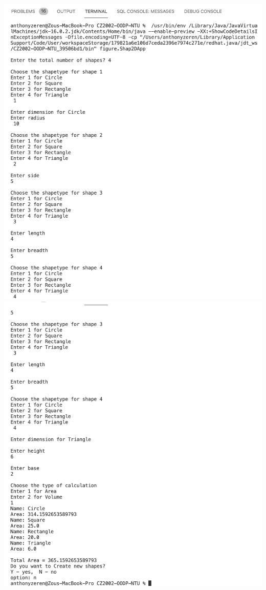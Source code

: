 \documentclass[hidelinks,12pt]{article}
\begin{document}
\includegraphics[scale=0.4]{tc2D1.png}
\includegraphics[scale=0.4]{tc2D2.png}
\end{document}
